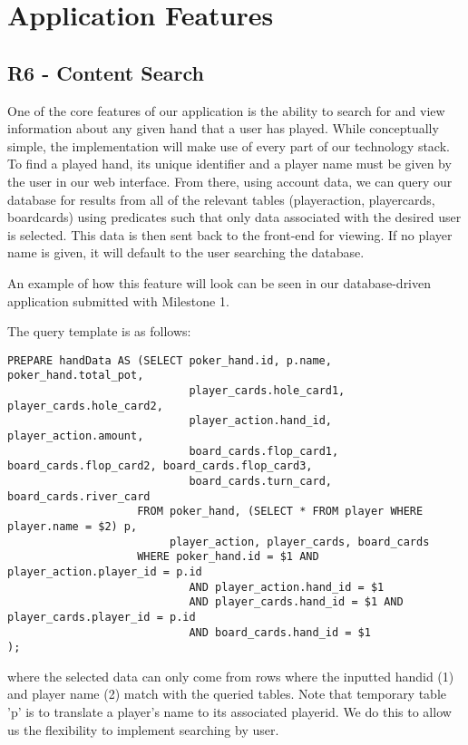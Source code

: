\documentclass{article}
\begin{document}
\section*{Application Features}
    \subsection*{R6 - Content Search}

        One of the core features of our application is the ability to search for and view information about any given hand that a user has played. While conceptually simple, the implementation 
        will make use of every part of our technology stack. To find a played hand, its unique identifier and a player name must be given by the user in our web interface. 
        From there, using account data, we can query our database for results from all of the relevant tables (player\textunderscore action, player\textunderscore cards, board\textunderscore cards) 
        using predicates such that only data associated with the desired user is selected. This data is then sent back to the front-end for viewing. If no player name is given, it will default to the
        user searching the database.

        An example of how this feature will look can be seen in our database-driven application submitted with Milestone 1.

        The query template is as follows:
        \begin{verbatim}
PREPARE handData AS (SELECT poker_hand.id, p.name, poker_hand.total_pot, 
                            player_cards.hole_card1, player_cards.hole_card2,
                            player_action.hand_id, player_action.amount,
                            board_cards.flop_card1, board_cards.flop_card2, board_cards.flop_card3,
                            board_cards.turn_card, board_cards.river_card
                    FROM poker_hand, (SELECT * FROM player WHERE player.name = $2) p, 
                         player_action, player_cards, board_cards
                    WHERE poker_hand.id = $1 AND player_action.player_id = p.id 
                            AND player_action.hand_id = $1
                            AND player_cards.hand_id = $1 AND player_cards.player_id = p.id
                            AND board_cards.hand_id = $1
);
        \end{verbatim}
        where the selected data can only come from rows where the inputted hand\textunderscore id (1) and player name (2) match with the queried tables.
        Note that temporary table 'p' is to translate a player's name to its associated player\textunderscore id. We do this to allow us the flexibility to 
        implement searching by user.
\end{document}
